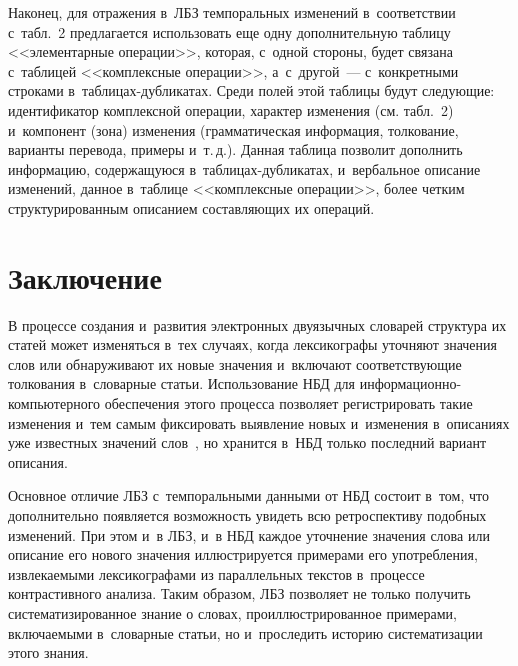 \begin{multicols}{2}
    Наконец, для отражения в~ЛБЗ темпоральных изменений в~соответствии 
с~табл.~2 предлагается использовать еще одну дополнительную таблицу 
<<элементарные операции>>, которая, с~одной стороны, будет связана 
с~таблицей <<комплексные операции>>, а~с~другой~--- с~конкретными 
строками в~таб\-ли\-цах-дуб\-ли\-ка\-тах. Среди полей этой таблицы будут 
следующие: идентификатор комплексной операции, характер изменения (см. 
табл.~2) и~компонент (зона) изменения (грамматическая информация, 
толкование, варианты перевода, примеры и~т.\,д.). Данная таблица позволит 
дополнить информацию, содержащуюся в~таб\-ли\-цах-дуб\-ли\-ка\-тах, 
и~вербальное описание изменений, данное в~таб\-ли\-це <<комплексные 
операции>>, более четким структурированным описанием составляющих их 
операций.
    
    
    \vspace*{-3pt}
    
\section{Заключение}

\vspace*{-3pt}

    В процессе создания и~развития электронных двуязычных словарей 
структура их статей может изменяться в~тех случаях, когда лексикографы 
уточняют значения слов или обнаруживают их новые значения и~включают 
соответствующие толкования в~словарные статьи. Использование НБД для  
ин\-фор\-ма\-ци\-он\-но-ком\-пью\-тер\-но\-го обеспечения этого процесса 
позволяет регистрировать такие изменения и~тем самым фиксировать 
выявление новых и~изменения в~описаниях уже известных значений  
слов~\cite{3-gon, 7-gon, 8-gon, 9-gon}, но хранится в~НБД только последний 
вариант описания.
    
    Основное отличие ЛБЗ с~темпоральными данными от НБД состоит 
в~том, что дополнительно появляется возможность увидеть всю 
ретроспективу подобных изменений. При этом и~в ЛБЗ, и~в НБД каждое 
уточнение значения слова или описание его нового значения иллюстрируется 
примерами его употребления, извлекаемыми лексикографами из 
параллельных текстов в~процессе контрастивного анализа. Таким образом, 
ЛБЗ позволяет не только получить систематизированное знание о словах, 
проиллюстрированное примерами, включаемыми в~словарные статьи, но 
и~проследить историю сис\-те\-ма\-ти\-за\-ции этого знания.
    
\vspace*{-3pt}
    

\end{multicols}
